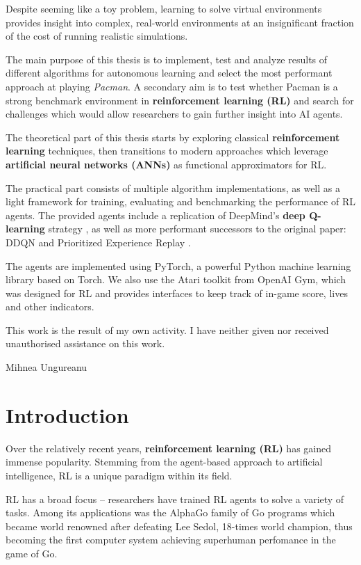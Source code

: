 \documentclass[12pt,twoside]{report}
\begin{document}
Despite seeming like a toy problem, learning to solve virtual environments provides insight into complex, real-world environments at an insignificant fraction of the cost of running realistic simulations.

The main purpose of this thesis is to implement, test and analyze results of different algorithms for autonomous learning and select the most performant approach at playing \emph{Pacman}.
A secondary aim is to test whether Pacman is a strong benchmark environment in \textbf{reinforcement learning (RL)} and search for challenges which would allow researchers to gain further insight into AI agents.

The theoretical part of this thesis starts by exploring classical \textbf{reinforcement learning} techniques, then transitions to modern approaches which leverage \textbf{artificial neural networks (ANNs)} as functional approximators for RL.

The practical part consists of multiple algorithm implementations, as well as a light framework for training, evaluating and benchmarking the performance of RL agents.
The provided agents include a replication of DeepMind’s \textbf{deep  Q-learning} strategy \cite{atari-dqn}, as well as more performant successors to the original paper: DDQN \cite{ddqn-paper} and Prioritized Experience Replay \cite{per-paper}.

The agents are implemented using PyTorch, a powerful Python machine learning library based on Torch. We also use the Atari toolkit from OpenAI Gym, which was designed for RL and provides interfaces to keep track of in-game score, lives and other indicators.

\hfill \break
This work is the result of my own activity. I have neither given nor received unauthorised assistance on this work.
\begin{flushright}
    Mihnea Ungureanu
\end{flushright}

\tableofcontents


\chapter{Introduction}
Over the relatively recent years, \textbf{reinforcement learning (RL)} has gained immense popularity.
Stemming from the agent-based approach to artificial intelligence, RL is a unique paradigm within its field.

RL has a broad focus -- researchers have trained RL agents to solve a variety of tasks.
Among its applications was the AlphaGo family of Go programs \cite{ago, alpha-zero} which became world renowned after defeating Lee Sedol, 18-times world champion, thus becoming the first computer system achieving superhuman perfomance in the game of Go.
\end{document}
